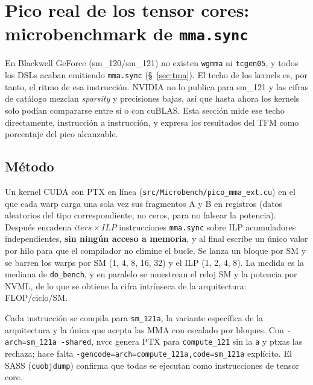 
\section{Pico real de los tensor cores: microbenchmark de \texttt{mma.sync}}
\label{sec:pico-mma}

En Blackwell GeForce (sm\_120/sm\_121) no existen \texttt{wgmma} ni \texttt{tcgen05}, y todos
los DSLs acaban emitiendo \texttt{mma.sync} (§~\ref{sec:tma}). El techo de los kernels es, por
tanto, el ritmo de esa instrucción. NVIDIA no lo publica para sm\_121 y las cifras de catálogo
mezclan \emph{sparsity} y precisiones bajas, así que hasta ahora los kernels solo podían
compararse entre sí o con cuBLAS. Esta sección mide ese techo directamente, instrucción a
instrucción, y expresa los resultados del TFM como porcentaje del pico alcanzable.

\subsection{Método}

Un kernel CUDA con PTX en línea (\texttt{src/Microbench/pico\_mma\_ext.cu}) en el que cada warp
carga una sola vez sus fragmentos A y B en registros (datos aleatorios del tipo
correspondiente, no ceros, para no falsear la potencia). Después encadena
$\mathit{iters}\times\mathit{ILP}$ instrucciones \texttt{mma.sync} sobre ILP acumuladores
independientes, \textbf{sin ningún acceso a memoria}, y al final escribe un único valor por hilo
para que el compilador no elimine el bucle. Se lanza un bloque por SM y se barren los warps por
SM (1, 4, 8, 16, 32) y el ILP (1, 2, 4, 8). La medida es la mediana de \texttt{do\_bench}, y en
paralelo se muestrean el reloj SM y la potencia por NVML, de lo que se obtiene la cifra
intrínseca de la arquitectura: FLOP/ciclo/SM.

Cada instrucción se compila para \texttt{sm\_121a}, la variante específica de la arquitectura
y la única que acepta las MMA con escalado por bloques. Con \texttt{-arch=sm\_121a -shared},
nvcc genera PTX para \texttt{compute\_121} sin la \texttt{a} y ptxas las rechaza; hace falta
\texttt{-gencode=arch=compute\_121a,code=sm\_121a} explícito. El SASS (\texttt{cuobjdump})
confirma que todas se ejecutan como instrucciones de tensor core.

